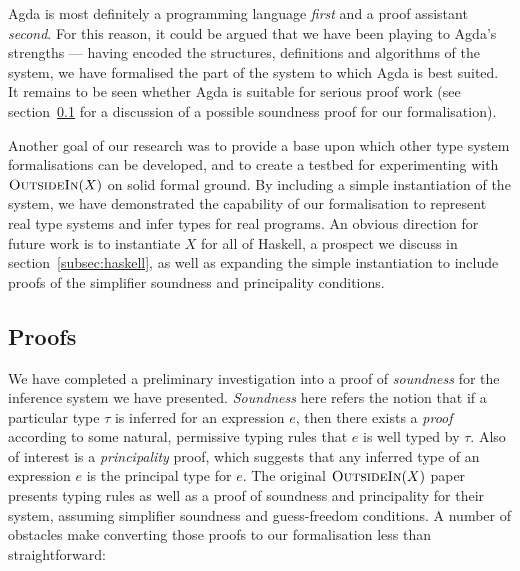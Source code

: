 \documentclass[a4paper]{jfp}
\newcommand{\outsidein}{\textsc{OutsideIn}(X)}
\begin{document}
Agda is most definitely a programming language \emph{first} and a proof assistant \emph{second}. For this reason, it could be argued that we have been
playing to Agda's strengths --- having encoded the structures, definitions and algorithms of the system, we have formalised the part of the system 
to which Agda is best suited. It remains to be seen whether Agda is suitable for serious proof work (see section~\ref{subsec:soundness} for a
discussion of a possible soundness proof for our formalisation).

Another goal of our research was to provide a base upon which other type system formalisations can be developed, and to create a testbed for
experimenting with $\outsidein$ on solid formal ground. By including a simple instantiation of the system, we have demonstrated the capability of our
formalisation to represent real type systems and infer types for real programs. An obvious direction for future work is to instantiate $X$ for all of
Haskell, a prospect we discuss in section~\ref{subsec:haskell}, as well as expanding the simple instantiation to include proofs of the simplifier
soundness and principality conditions.   

\subsection{Proofs}
\label{subsec:soundness}

We have completed a preliminary investigation into a proof of \emph{soundness} for the inference system we have presented. \emph{Soundness} here
refers the notion that if a particular type $\tau$ is inferred for an expression $e$, then there exists a \emph{proof} according to some natural,
permissive typing rules that $e$ is well typed by $\tau$. Also of interest is a \emph{principality} proof, which suggests that any inferred type of an
expression $e$ is the principal type for $e$.  The original $\outsidein$ paper presents typing rules as well as a proof of soundness and principality
for their system, assuming simplifier soundness and guess-freedom conditions. A number of obstacles make converting those proofs to our formalisation
less than straightforward: 
\end{document}
